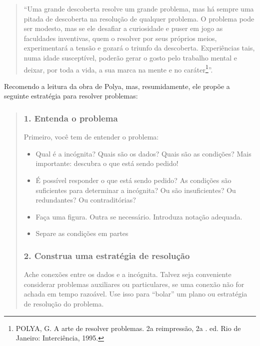 \documentclass[10pt,a4paper]{report}
\theoremstyle{definition}
\begin{document}
\begin{quotation}
``Uma grande descoberta resolve um grande problema, mas há sempre uma pitada de descoberta na resolução de qualquer problema. O problema pode ser modesto, mas se ele desafiar a curiosidade e puser em jogo as faculdades inventivas, quem o resolver por seus próprios meios, experimentará a tensão e gozará o triunfo da descoberta. Experiências tais, numa idade susceptível, poderão gerar o gosto pelo trabalho mental e deixar, por toda a vida, a sua marca na mente e no caráter\footnote{POLYA, G. A arte de resolver problemas. 2a reimpressão, 2a . ed. Rio de Janeiro:
Interciência, 1995.}''.
\end{quotation}
Recomendo a leitura da obra de Polya, mas, resumidamente, ele propõe a seguinte estratégia para resolver problemas:
\begin{quote}
\subsubsection{1. Entenda o problema}
        Primeiro, você tem de entender o problema:
\begin{itemize}
\item        Qual é a incógnita? Quais são os dados? Quais são as condições? Mais importante: descubra o que está sendo pedido!
\item        É possível responder o que está sendo pedido? As condições são suficientes para determinar a incógnita? Ou são insuficientes? Ou redundantes? Ou contraditórias?
\item        Faça uma figura. Outra se necessário. Introduza notação adequada.
\item        Separe as condições em partes
\end{itemize}

\subsubsection{2. Construa uma estratégia de resolução}    
Ache conexões entre os dados e a incógnita. Talvez seja conveniente considerar problemas auxiliares ou particulares, se uma conexão não for achada em tempo razoável. Use isso para ``bolar'' um plano ou estratégia de resolução do problema.
\begin{itemize}


\end{itemize}
\end{quote}
\end{document}
